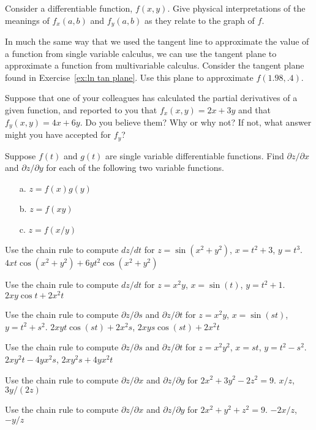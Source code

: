\begin{multicols}{2}
\problem Consider a differentiable function, $f(x,y)$.  Give physical %
interpretations of the meanings of $f_x(a,b)$ and $f_y(a,b)$ as they
relate to the graph of $f$.

\problem In much the same way that we used the tangent line to %
approximate the value of a function from single variable calculus,
we can use the tangent plane to approximate a function from
multivariable calculus.  Consider the tangent plane found in
Exercise~\ref{ex:ln tan plane}. Use this plane to approximate
$f(1.98, .4)$.

\problem Suppose that one of your colleagues has calculated the partial %
derivatives of a given function, and reported to you that
$f_x(x,y)=2x+3y$ and that $f_y(x,y)=4x+6y$.  Do you believe them?
Why or why not?  If not, what answer might you have accepted for
$f_y$?

\problem Suppose $f(t)$ and $g(t)$ are single variable differentiable %
functions.  Find $\partial z/\partial x$ and
$\partial z/\partial y$ for each of the following two variable functions.

\begin{itemize}
\item[a.] $z=f(x)g(y)$
\item[b.] $z=f(xy)$
\item[c.] $z=f(x/y)$
\end{itemize}






\problem Use the chain rule to compute $dz/dt$ for %
$z=\sin(x^2+y^2)$, $x=t^2+3$, $y=t^3$.
\answer
$4xt\cos(x^2+y^2)+6yt^2\cos(x^2+y^2)$
\endanswer

\problem Use the chain rule to compute $dz/dt$ for %
$z=x^2y$, $x=\sin(t)$, $y=t^2+1$.
\answer
$2xy\cos t+2x^2t$
\endanswer

\problem Use the chain rule to compute $\partial z/\partial s$ and  %
$\partial z/\partial t$ for
$z=x^2y$, $x=\sin(st)$, $y=t^2+s^2$.
\answer
$2xyt\cos(st)+2x^2s$, $2xys\cos(st)+2x^2t$
\endanswer

\problem Use the chain rule to compute $\partial z/\partial s$ and  %
$\partial z/\partial t$ for
$z=x^2y^2$, $x=st$, $y=t^2-s^2$.
\answer
$2xy^2t-4yx^2s$, $2xy^2s+4yx^2t$
\endanswer

\problem Use the chain rule to compute $\partial z/\partial x$ and  %
$\partial z/\partial y$ for $2x^2+3y^2-2z^2=9$.
\answer
$x/z$, $3y/(2z)$
\endanswer

\problem Use the chain rule to compute $\partial z/\partial x$ and  %
$\partial z/\partial y$ for $2x^2+y^2+z^2=9$.
\answer
$-2x/z$, $-y/z$
\endanswer



\end{multicols}

